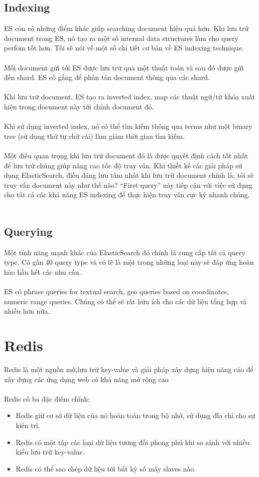 \documentclass[a4paper,12pt]{report}
\begin{document}
\subsection*{Indexing}
ES còn có những điểm khác giúp searching document hiệu quả hơn. Khi lưu trữ document trong ES, nó tạo ra một số internal data structures làm cho query perfom tốt hơn. Tôi sẽ nói về một số chi tiết cơ bản về ES indexing technique.
\\ \\
Mỗi document gửi tới ES được lưu trữ qua một thuật toán và sau đó được gửi đến shard. ES cố gắng để phân tán document thông qua các shard.
\\ \\
Khi lưu trữ document, ES tạo ra inverted index, map các thuật ngữ/từ khóa xuất hiện trong document này tới chính document đó.
\\ \\
Khi sử dụng inverted index, nó có thể tìm kiếm thông qua terms như một binary tree (sử dụng thứ tự chữ cái) làm giảm thời gian tìm kiếm.
\\ \\
Một điều quan trọng khi lưu trữ document đó là được quyết định cách tốt nhất để lưu trữ chúng giúp nâng cao tốc độ truy vấn. Khi thiết kế các giải pháp sử dụng ElasticSearch, điều đáng lưu tâm nhất khi lưu trữ document chính là: tôi sẽ truy vấn document này như thế nào? “First query” này tiếp cận với việc sử dụng cho tất cả các khả năng ES indexing để thực hiện truy vấn cực kỳ nhanh chóng. \\ \\
\subsection*{Querying}
Một tính năng mạnh khác của ElasticSearch đó chính là cung cấp tất cả query type. Có gần 40 query type và có lẽ là một trong những loại này sẽ đáp ứng hoàn hảo hầu hết các nhu cầu.
\\ \\
ES có phrase queries for textual search, geo queries based on coordinates, numeric range queries. Chúng có thể sẽ rất hữu ích cho các dữ liệu tổng hợp và nhiều hơn nữa.
\section*{Redis}
Redis là một nguồn mở,lưu trữ key-value và giải pháp xây dựng hiệu năng cáo để xây dựng các ứng dụng web có khả năng mở rộng cao \\ \\
Redis có ba đặc điểm chính:
\begin{itemize}
\item Redis giữ cơ sở dữ liệu của nó hoàn toàn trong bộ nhớ, sử dụng đĩa chỉ cho sự kiên trì.
\item Redis có một tập các loại dữ liệu tương đối phong phú khi so sánh với nhiều kiểu lưu trữ key-value.
\item Redis có thể sao chép dữ liệu tới bất kỳ số máy slaves nào.
\end{itemize}
\end{document}
